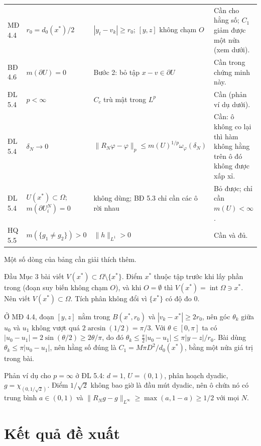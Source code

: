 \documentclass[12pt,a4paper]{article}
\theoremstyle{plain}
\theoremstyle{definition}
\begin{document}
{\begin{longtable}{@{}p{1.7cm}p{3.3cm}p{4.9cm}p{5.0cm}@{}}
MĐ 4.4 & $r_0=d_0(x^*)/2$ & $|y_t-v_k|\ge r_0$; $[y,z]$ không chạm $O$ & Cần cho hằng số; $C_1$ giảm được một nửa (xem dưới). \\
BĐ 4.6 & $m(\partial U)=0$ & Bước 2: bỏ tập $x-v\in\partial U$ & Cần trong chứng minh này. \\
ĐL 5.4 & $p<\infty$ & $C_c$ trù mật trong $L^p$ & Cần (phản ví dụ dưới). \\
ĐL 5.4 & $\delta_N\to0$ & $\|R_N\varphi-\varphi\|_p\le m(U)^{1/p}\omega_\varphi(\delta_N)$ & Cần: ô không co lại thì hàm không hằng trên ô đó không được xấp xỉ. \\
ĐL 5.4 & $U(x^*)\subset\Omega$; $m(\partial U_i^N)=0$ & không dùng; BĐ 5.3 chỉ cần các ô rời nhau & Bỏ được; chỉ cần $m(U)<\infty$. \\
HQ 5.5 & $m(\{g_1\ne g_2\})>0$ & $\|h\|_{L^1}>0$ & Cần và đủ. \\
\bottomrule
\end{longtable}}

Một số dòng của bảng cần giải thích thêm.

Đầu Mục 3 bài viết $V(x^*)\subset\Omega\setminus\{x^*\}$. Điểm $x^*$ thuộc tập trước khi lấy phần trong (đoạn suy biến không chạm $O$), và khi $O=\emptyset$ thì $V(x^*)=\operatorname{int}\Omega\ni x^*$. Nên viết $V(x^*)\subset\Omega$. Tích phân không đổi vì $\{x^*\}$ có độ đo $0$.

Ở MĐ 4.4, đoạn $[y,z]$ nằm trong $B(x^*,r_0)$ và $|v_k-x^*|\ge2r_0$, nên góc $\theta_k$ giữa $u_0$ và $u_1$ không vượt quá $2\arcsin(1/2)=\pi/3$. Với $\theta\in[0,\pi]$ ta có $|u_0-u_1|=2\sin(\theta/2)\ge2\theta/\pi$, do đó $\theta_k\le\frac{\pi}{2}|u_0-u_1|\le\pi|y-z|/r_0$. Bài dùng $\theta_k\le\pi|u_0-u_1|$, nên hằng số đúng là $C_1=M\pi D^2/d_0(x^*)$, bằng một nửa giá trị trong bài.

Phản ví dụ cho $p=\infty$ ở ĐL 5.4: $d=1$, $U=(0,1)$, phân hoạch dyadic, $g=\chi_{(0,1/\sqrt2)}$. Điểm $1/\sqrt2$ không bao giờ là đầu mút dyadic, nên ô chứa nó có trung bình $a\in(0,1)$ và $\|R_Ng-g\|_{L^\infty}\ge\max(a,1-a)\ge1/2$ với mọi $N$.

\section{Kết quả đề xuất}\label{sec:new}
\end{document}
